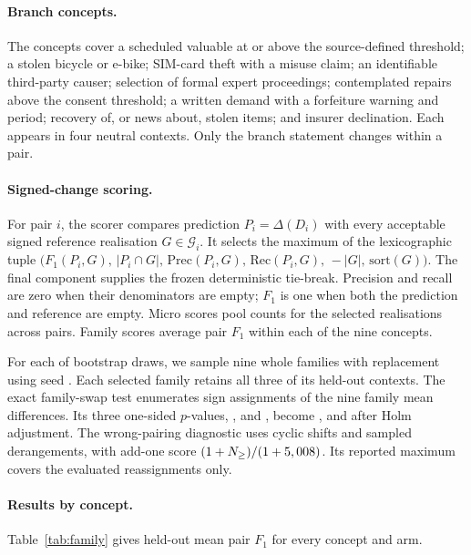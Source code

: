 \paragraph{Branch concepts.}
The \nConcepts{} concepts cover a scheduled valuable at or above the
source-defined threshold; a stolen bicycle or e-bike; SIM-card theft with
a misuse claim; an identifiable third-party causer; selection of formal
expert proceedings; contemplated repairs above the consent threshold;
a written demand with a forfeiture warning and period; recovery of, or
news about, stolen items; and insurer declination. Each appears in four
neutral contexts. Only the branch statement changes within a pair.

\paragraph{Signed-change scoring.}
\label{app:paired-metrics}
For pair $i$, the scorer compares prediction $P_i=\Delta(D_i)$ with every
acceptable signed reference realisation $G\in\mathcal G_i$. It selects the
maximum of the lexicographic tuple
$\bigl(F_1(P_i,G),\,|P_i\cap G|,\,\mathrm{Prec}(P_i,G),\,\mathrm{Rec}(P_i,G),\,-|G|,\,\mathrm{sort}(G)\bigr)$.
The final component supplies the frozen deterministic tie-break. Precision
and recall are zero when their denominators are empty; $F_1$ is one when
both the prediction and reference are empty. Micro scores pool counts for
the selected realisations across \nPairsHid{} pairs. Family scores average
pair $F_1$ within each of the nine concepts.

For each of \bootDraws{} bootstrap draws, we sample nine whole families
with replacement using seed \bootSeed. Each selected family retains all
three of its held-out contexts. The exact family-swap test enumerates
\swapAssignments{} sign assignments of the nine family mean differences.
Its three one-sided $p$-values, \pRawDir, \pRawGc{} and \pRawEf, become
\pHolmDir, \pHolmGc{} and \pHolmEf{} after Holm adjustment. The
wrong-pairing diagnostic uses \wpShifts{} cyclic shifts and \wpDraws{}
sampled derangements, with add-one score
$(1+N_{\ge})/(1+5,008)$. Its reported maximum covers the evaluated
reassignments only.

\paragraph{Results by concept.}
\label{app:family}
Table~\ref{tab:family} gives held-out mean pair $F_1$ for every concept
and arm.
\begin{table}[htb]
\centering\small

\caption{Held-out mean pair $F_1$ for each branch concept.}
\label{tab:family}
\end{table}

